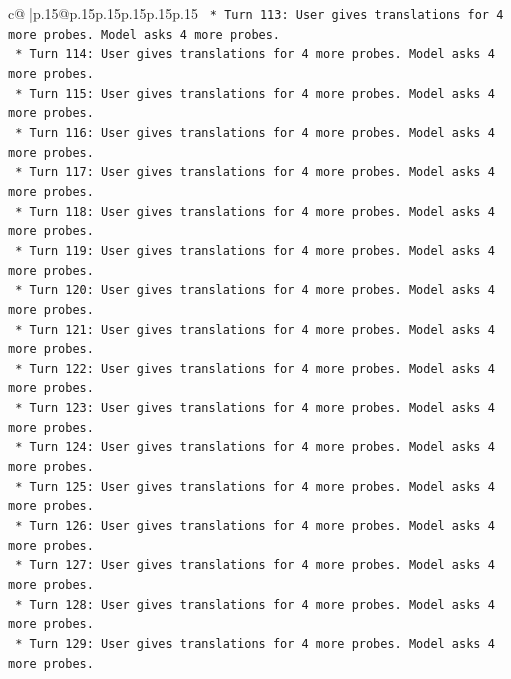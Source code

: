 \documentclass{article}
\begin{document}
{\begin{supertabular}{c@{$\;$}|p{.15\linewidth}@{}p{.15\linewidth}p{.15\linewidth}p{.15\linewidth}p{.15\linewidth}p{.15\linewidth}}
{{{\texttt{                    *   Turn 113: User gives translations for 4 more probes. Model asks 4 more probes.} \\
\texttt{                    *   Turn 114: User gives translations for 4 more probes. Model asks 4 more probes.} \\
\texttt{                    *   Turn 115: User gives translations for 4 more probes. Model asks 4 more probes.} \\
\texttt{                    *   Turn 116: User gives translations for 4 more probes. Model asks 4 more probes.} \\
\texttt{                    *   Turn 117: User gives translations for 4 more probes. Model asks 4 more probes.} \\
\texttt{                    *   Turn 118: User gives translations for 4 more probes. Model asks 4 more probes.} \\
\texttt{                    *   Turn 119: User gives translations for 4 more probes. Model asks 4 more probes.} \\
\texttt{                    *   Turn 120: User gives translations for 4 more probes. Model asks 4 more probes.} \\
\texttt{                    *   Turn 121: User gives translations for 4 more probes. Model asks 4 more probes.} \\
\texttt{                    *   Turn 122: User gives translations for 4 more probes. Model asks 4 more probes.} \\
\texttt{                    *   Turn 123: User gives translations for 4 more probes. Model asks 4 more probes.} \\
\texttt{                    *   Turn 124: User gives translations for 4 more probes. Model asks 4 more probes.} \\
\texttt{                    *   Turn 125: User gives translations for 4 more probes. Model asks 4 more probes.} \\
\texttt{                    *   Turn 126: User gives translations for 4 more probes. Model asks 4 more probes.} \\
\texttt{                    *   Turn 127: User gives translations for 4 more probes. Model asks 4 more probes.} \\
\texttt{                    *   Turn 128: User gives translations for 4 more probes. Model asks 4 more probes.} \\
\texttt{                    *   Turn 129: User gives translations for 4 more probes. Model asks 4 more probes.} \\
}}}
\end{supertabular}}
\end{document}

